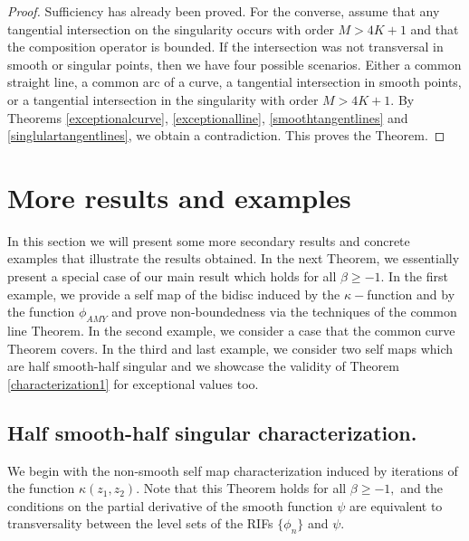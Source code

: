 \documentclass[12pt]{amsart}
\numberwithin{equation}{section}
\begin{document}
\begin{proof} Sufficiency has already been proved. For the converse, assume that any tangential intersection on the singularity occurs with order $M>4K+1$ and that the composition operator is bounded. If the intersection was not transversal in smooth or singular points, then we have four possible scenarios. Either a common straight line, a common arc of a curve, a tangential intersection in smooth points, or a tangential intersection in the singularity with order $M>4K+1.$ By Theorems \ref{exceptionalcurve}, \ref{exceptionalline}, \ref{smoothtangentlines} and \ref{singlulartangentlines}, we obtain a contradiction. This proves the Theorem.
\end{proof}


\section{More results and examples}\label{examples} In this section we will present some more secondary results and concrete examples that illustrate the results obtained. In the next Theorem, we essentially present a special case of our main result which holds for all $\beta\ge-1.$ In the first example, we provide a self map of the bidisc induced by the $\kappa-$function and by the function $\phi_{AMY}$ and prove non-boundedness via the techniques of the common line Theorem. In the second example, we consider a case that the common curve Theorem covers. In the third and last example, we consider two self maps which are half smooth-half singular and we showcase the validity of Theorem \ref{characterization1} for exceptional values too.

\subsection{Half smooth-half singular characterization.}
We begin with the non-smooth self map characterization induced by iterations of the function $\kappa(z_1,z_2).$ Note that this Theorem holds for all $\beta\ge-1,$ and the conditions on the partial derivative of the smooth function $\psi$ are equivalent to transversality between the level sets of the RIFs $\{\phi_n\}$ and $\psi.$
\end{document}

